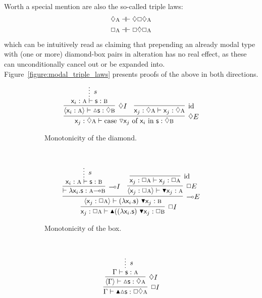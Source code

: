 Worth a special mention are also the so-called triple laws:
\begin{align}
	\diamond\prop{a} \dashv\vdash \diamond\Box\diamond\prop{a}\\
	\Box\prop{a} \dashv\vdash \Box\diamond\Box\prop{a}
\end{align}
which can be intuitively read as claiming that prepending an already modal type with (one or more) diamond-box pairs in alteration has no real effect, as these can unconditionally cancel out or be expanded into.
Figure~\ref{figure:modal_triple_laws} presents proofs of the above in both directions.

\begin{figure}
	\centering
	\begin{subfigure}{1\textwidth}
		\[
			\infer[\diamond E]{\term{\varj}: \diamond \prop{a} \vdash  \cterm{case \term{\diaelim \varj} of \term{\vari } in \term{s}}: \diamond \prop{b}}{
					\infer[\diamond I]{\bracket{\term{\vari }: \prop{a}} \vdash \diaintro \term{s}: \diamond \prop{b}}{
						\infer*[s]{\term{\vari }: \prop{a} \vdash \term{s}: \prop{b}}{}
					}
					&
					\infer[\Ax]{\term{\varj}: \diamond \prop{a} \vdash \term{\varj}: \diamond \prop{a}}{}
			}
		\]
		\caption{Monotonicity of the diamond.}
		\label{subfigure:modal_properties:diamond_mono}
	\end{subfigure}\\[\midsep]
	\begin{subfigure}{1\textwidth}
		\[
			\infer[\Box I]{\term{\varj}: \Box \prop{a} \vdash \boxintro{((\term{\lam \vari .s})~\term{\boxelim \varj}}:\Box \prop{b}}{
				\infer[\li E]{\bracket{\term{\varj}: \Box \prop{a}} \vdash (\term{\lam \vari .s})~\term{\boxelim \varj}: \prop{b}}{
					\infer[\li I]{\vdash \term{\lam \vari .s}: \prop{a} \li\prop{b}}{
						\infer*[s]{\term{\vari }: \prop{a} \vdash \term{s}: \prop{b}}{}
					}
					&
					\infer[\Box E]{\bracket{\term{\varj}: \Box \prop{a}} \vdash \boxelim\term{\varj}:\prop{a}}{	
						\infer[\Ax]{\term{\varj}: \Box\prop{a} \vdash \term{\varj}: \Box\prop{a}}{}
					}
				}
			}
		\]
		\caption{Monotonicity of the box.}
		\label{subfigure:modal_properties:box_mono}
	\end{subfigure}\\[\midsep]
	\begin{subfigure}{0.4\textwidth}
		\[
		\infer[\Box I]{\Gamma \vdash \boxintro\diaintro\term{s}:\Box \diamond \prop{a}}{
			\infer[\diamond I]{\bracket{\Gamma} \vdash \diaintro\term{s}: \diamond \prop{a}}{
				\infer*[s]{\Gamma \vdash \term{s}: \prop{a}}{}
}}\]
\end{subfigure}
\end{figure}
